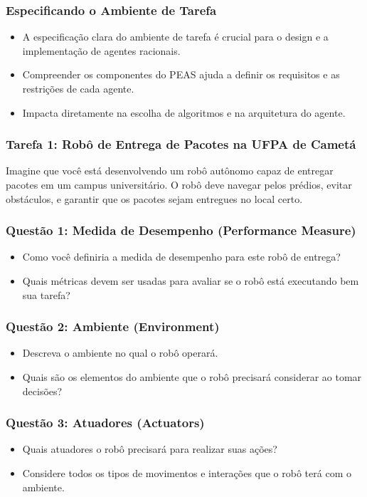 \documentclass{beamer}
\begin{document}
\begin{frame}
\frametitle{Especificando o Ambiente de Tarefa}
\begin{itemize}
    \item A especificação clara do ambiente de tarefa é crucial para o design e a implementação de agentes racionais.
    \item Compreender os componentes do PEAS ajuda a definir os requisitos e as restrições de cada agente.
    \item Impacta diretamente na escolha de algoritmos e na arquitetura do agente.
\end{itemize}
\end{frame}


\begin{frame}
\frametitle{Tarefa 1: Robô de Entrega de Pacotes na UFPA de Cametá}
Imagine que você está desenvolvendo um robô autônomo capaz de entregar pacotes em um campus universitário. O robô deve navegar pelos prédios, evitar obstáculos, e garantir que os pacotes sejam entregues no local certo.
\end{frame}

\begin{frame}
\frametitle{Questão 1: Medida de Desempenho (Performance Measure)}
\begin{itemize}
    \item Como você definiria a medida de desempenho para este robô de entrega?
    \item Quais métricas devem ser usadas para avaliar se o robô está executando bem sua tarefa?
\end{itemize}
\end{frame}

\begin{frame}
\frametitle{Questão 2: Ambiente (Environment)}
\begin{itemize}
    \item Descreva o ambiente no qual o robô operará.
    \item Quais são os elementos do ambiente que o robô precisará considerar ao tomar decisões?
\end{itemize}

\end{frame}

\begin{frame}
\frametitle{Questão 3: Atuadores (Actuators)}
\begin{itemize}
    \item Quais atuadores o robô precisará para realizar suas ações?
    \item Considere todos os tipos de movimentos e interações que o robô terá com o ambiente.
\end{itemize}
\end{frame}
\end{document}
